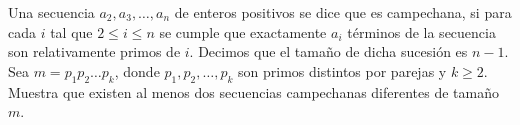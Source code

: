 Una secuencia $a_2, a_3, \dots, a_n$ de enteros positivos se dice que es campechana, si para cada $i$ tal que $2 \leq i \leq n$ se cumple que exactamente $a_i$ términos de la secuencia son relativamente primos de $i$. Decimos que el tamaño de dicha sucesión es $n - 1$. Sea $m = p_1p_2 \dots p_k$, donde $p_1, p_2, \dots, p_k$ son primos distintos por parejas y $k \geq 2$. Muestra que existen al menos dos secuencias campechanas diferentes de tamaño $m$.
